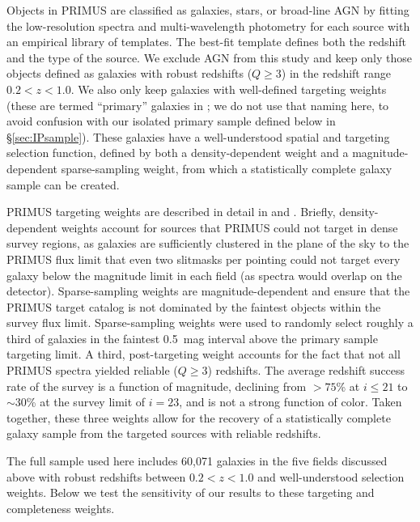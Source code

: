 Objects in PRIMUS are classified as galaxies, stars, or broad-line AGN by fitting the low-resolution spectra and multi-wavelength photometry 
for each source with an empirical library of templates.
The best-fit template defines both the redshift and the type of the source.  
We exclude AGN from this study and keep only those objects defined as galaxies with robust redshifts {($Q\ge 3$)} in the redshift range ${0.2<z<1.0}$.
We also only keep galaxies with well-defined targeting weights (these are termed ``primary'' galaxies in \citet{Coil11}; we do not use that naming here, to avoid 
confusion with our isolated primary sample defined below in \S\ref{sec:IPsample}).
These galaxies have a well-understood spatial and targeting selection function, defined by both a density-dependent weight and a magnitude-dependent sparse-sampling 
weight, from which a statistically complete galaxy sample can be created.

PRIMUS targeting weights are described in detail in \citet{Coil11} and \citet{Cool13}.
Briefly, density-dependent weights account for sources that PRIMUS could not target in dense survey regions, as galaxies are sufficiently clustered in the 
plane of
the sky to the PRIMUS flux limit that even two slitmasks per pointing could not target every galaxy below the magnitude limit in each field (as spectra would overlap on the detector). 
Sparse-sampling weights are magnitude-dependent and ensure that the PRIMUS target catalog is not dominated by the faintest objects within the survey flux limit. Sparse-sampling weights were used to randomly select roughly a third 
of galaxies in the faintest 0.5~mag interval above the primary sample 
targeting limit.
A third, post-targeting weight \citep[detailed in][]{Cool13} accounts for the fact that not all PRIMUS spectra yielded reliable {($Q \ge 3$)} redshifts.
The average redshift success rate of the survey is a function of magnitude, declining from $>75$\% at ${i\le21}$ to $\sim30$\% at the survey limit of $i=23$, and is not a strong function of color.  
Taken together, these three weights allow for the recovery of a statistically complete galaxy sample from the targeted sources with reliable redshifts.  

The full sample used here includes 60,071 galaxies in the five fields discussed above with robust redshifts between $0.2<z<1.0$ and well-understood selection weights.
Below we test the sensitivity of our results to these targeting and completeness weights.

